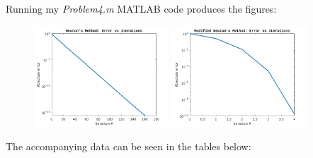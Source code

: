 \documentclass[a4paper,12pt]{article}
\begin{document}
\begin{enumerate}[label = \arabic*.]
\begin{enumerate}[label = \roman*.]
            Running my \emph{Problem4.m} MATLAB code produces the figures:
            \begin{figure}[h!]
                \centering
                \includegraphics[width = 0.45\textwidth]{"images/Newton.png"}
                \includegraphics[width = 0.45\textwidth]{"images/Modified_Newton.png"}
            \end{figure}
            
            \newpage
            The accompanying data can be seen in the tables below:
            

\end{enumerate}
\end{enumerate}
\end{document}
